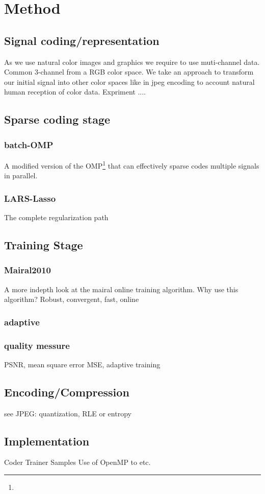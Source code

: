 \chapter{Method}


\section{Signal coding/representation}
As we use natural color images and graphics we require to use muti-channel data. Common 3-channel from a RGB color space.
We take an approach to transform our initial signal into other color spaces like in jpeg encoding to account natural human reception of
color data. 
Expriment ....

\section{Sparse coding stage}
\subsection{batch-OMP}
A modified version of the OMP\footnote{} that can effectively sparse codes multiple signals in parallel.

\subsection{LARS-Lasso}
The complete regularization path

\section{Training Stage}
\subsection{Mairal2010}
A more indepth look at the mairal online training algorithm. 
Why use this algorithm? Robust, convergent, fast, online

\subsection{adaptive}

\subsection{quality messure}
PSNR, mean square error MSE, adaptive training 

\section{Encoding/Compression}
see JPEG: quantization, RLE or entropy

\section{Implementation}


Coder
Trainer
Samples
Use of OpenMP to 
etc.


